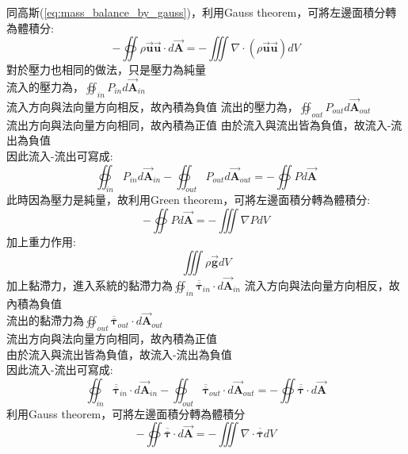 \documentclass[../main.tex]{subfiles}
\begin{document}
\begin{itemize}
    同高斯(\ref{eq:mass_balance_by_gauss})，利用Gauss theorem，可將左邊面積分轉為體積分:
    \begin{equation}
       -\oiint \rho \vec {\bm u} \vec {\bm u} \cdot d\vec {\bm A} = -\iiint \nabla \cdot (\rho \vec {\bm u} \vec {\bm u}) dV
    \end{equation}
    對於壓力也相同的做法，只是壓力為純量\\
    流入的壓力為，$\oiint_{in} P_{in} d\vec {\bm A}_{in}$\\
    流入方向與法向量方向相反，故內積為負值
    流出的壓力為，$\oiint_{out} P_{out} d\vec {\bm A}_{out}$\\
    流出方向與法向量方向相同，故內積為正值
    由於流入與流出皆為負值，故流入-流出為負值\\
    因此流入-流出可寫成:
    \begin{equation}
      \oiint_{in} P_{in} d\vec {\bm A}_{in} - \oiint_{out} P_{out} d\vec {\bm A}_{out} = -\oiint P d\vec {\bm A}
    \end{equation}
    此時因為壓力是純量，故利用Green theorem，可將左邊面積分轉為體積分:
    \begin{equation}
      -\oiint P d\vec {\bm A} = -\iiint \nabla P dV
    \end{equation}
    加上重力作用:
    \begin{equation}
      \iiint \rho \vec {\bm g} dV
    \end{equation}
    加上黏滯力，進入系統的黏滯力為$\oiint_{in} \overline {\overline {\bm \tau}}_{in} \cdot d\vec {\bm A}_{in}$
    流入方向與法向量方向相反，故內積為負值\\
    流出的黏滯力為$\oiint_{out} \overline{\overline{\bm \tau}}_{out} \cdot d\vec {\bm A}_{out}$\\
    流出方向與法向量方向相同，故內積為正值\\
    由於流入與流出皆為負值，故流入-流出為負值\\
    因此流入-流出可寫成:
    \begin{equation}
      \oiint_{in} \overline {\overline{\bm \tau}}_{in} \cdot d\vec {\bm A}_{in} - \oiint_{out} \overline{\overline{\bm \tau}}_{out} \cdot d\vec {\bm A}_{out} 
      = -\oiint \overline{\overline{\bm \tau}} \cdot d\vec {\bm A}
    \end{equation}
    利用Gauss theorem，可將左邊面積分轉為體積分
    \begin{equation}
      -\oiint \overline{\overline{\bm \tau}} \cdot d\vec {\bm A} = -\iiint \nabla \cdot \overline{\overline{\bm \tau}} dV
    \end{equation}

\end{itemize}
\end{document}

